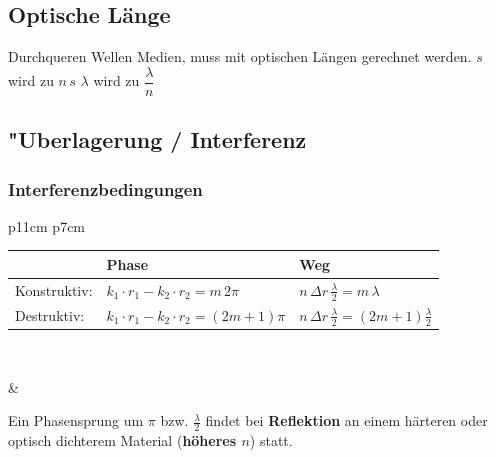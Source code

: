 \subsection{Optische Länge}
Durchqueren Wellen Medien, muss mit optischen Längen gerechnet werden.\qquad 
$s$ wird zu $n\,s$ \qquad $\lambda$ wird zu $\dfrac{\lambda}{n}$



\subsection{"Uberlagerung / Interferenz  }
\setlength{\tabcolsep}{5pt}
\renewcommand{\arraystretch}{2}
\subsubsection{Interferenzbedingungen}
\begin{tabular}{p{11cm} p{7cm}}
\begin{minipage}[]{11cm}
	\begin{tabular}{|l|l|l|}
	\hline
	& \textbf{Phase} & \textbf{Weg} \\
	\hline
	Konstruktiv: 
		& $k_1\cdot r_1-k_2\cdot r_2=m \, 2\pi$
		& $n \, \Delta r \, \frac{\lambda}{2} = m \, \lambda$ \\
	Destruktiv: 
	 	& $k_1\cdot r_1-k_2\cdot r_2=(2m+1)\pi$
	 	& $n \, \Delta r \, \frac{\lambda}{2} = (2m+1) \frac{\lambda}{2}$ \\
	\hline
	\end{tabular}\\
	\end{minipage}

	& \parbox{7cm}{
		Ein Phasensprung um $\pi$ bzw. $\frac{\lambda}{2}$ findet bei
		\textbf{Reflektion} an einem härteren oder optisch dichterem Material
		(\textbf{höheres $n$}) statt.
	}
\end{tabular}

